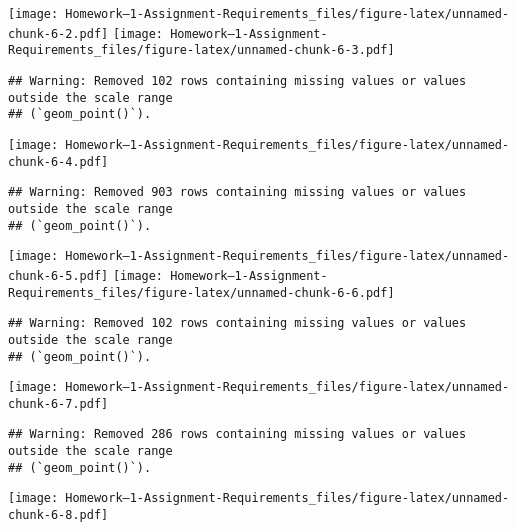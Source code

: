 \documentclass[
]{article}
\begin{document}
\texttt{[image: Homework--1-Assignment-Requirements\_files/figure-latex/unnamed-chunk-6-2.pdf]}
\texttt{[image: Homework--1-Assignment-Requirements\_files/figure-latex/unnamed-chunk-6-3.pdf]}

\begin{verbatim}
## Warning: Removed 102 rows containing missing values or values outside the scale range
## (`geom_point()`).
\end{verbatim}

\texttt{[image: Homework--1-Assignment-Requirements\_files/figure-latex/unnamed-chunk-6-4.pdf]}

\begin{verbatim}
## Warning: Removed 903 rows containing missing values or values outside the scale range
## (`geom_point()`).
\end{verbatim}

\texttt{[image: Homework--1-Assignment-Requirements\_files/figure-latex/unnamed-chunk-6-5.pdf]}
\texttt{[image: Homework--1-Assignment-Requirements\_files/figure-latex/unnamed-chunk-6-6.pdf]}

\begin{verbatim}
## Warning: Removed 102 rows containing missing values or values outside the scale range
## (`geom_point()`).
\end{verbatim}

\texttt{[image: Homework--1-Assignment-Requirements\_files/figure-latex/unnamed-chunk-6-7.pdf]}

\begin{verbatim}
## Warning: Removed 286 rows containing missing values or values outside the scale range
## (`geom_point()`).
\end{verbatim}

\texttt{[image: Homework--1-Assignment-Requirements\_files/figure-latex/unnamed-chunk-6-8.pdf]}
\end{document}
